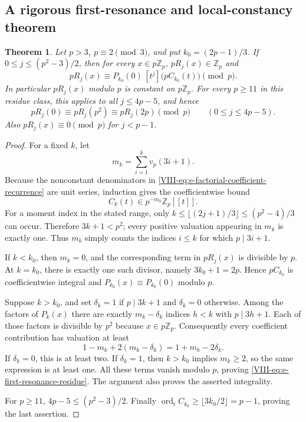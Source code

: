 \documentclass[11pt,letterpaper]{article}
\newtheorem{theorem}{Theorem}[section]
\numberwithin{equation}{section}
\begin{document}
\subsection{A rigorous first-resonance and local-constancy theorem}
\begin{theorem}\label{VIII-thm:e-first-resonance}
Let $p>3$, $p\equiv2\pmod3$, and put $k_0=(2p-1)/3$.
If $0\le j\le(p^2-3)/2$, then for every $x\in p\mathbb Z_p$,
$pR_j(x)\in\mathbb Z_p$ and
\begin{equation}\label{VIII-eq:e-first-resonance-residue}
 pR_j(x)\equiv
 P_{k_0}(0)\,[t^j]\bigl(pC_{k_0}(t)\bigr)\pmod p.
\end{equation}
In particular $pR_j(x)$ modulo $p$ is constant on $p\mathbb Z_p$.
For every $p\ge11$ in this residue class, this applies to all
$j\le4p-5$, and hence
\[
 pR_j(0)\equiv pR_j(p^2)\equiv pR_j(2p)\pmod p
 \qquad(0\le j\le4p-5).
\]
Also $pR_j(x)\equiv0\pmod p$ for $j<p-1$.
\end{theorem}
\begin{proof}
For a fixed $k$, let
\[
 m_k=\sum_{i=1}^k v_p(3i+1).
\]
Because the nonconstant denominators in
\eqref{VIII-eq:e-factorial-coefficient-recurrence} are unit series,
induction gives the coefficientwise bound
\[
 C_k(t)\in p^{-m_k}\mathbb Z_p[[t]].
\]
For a moment index in the stated range, only
$k\le\lfloor(2j+1)/3\rfloor\le(p^2-4)/3$ can occur.
Therefore $3k+1<p^2$; every positive valuation appearing in
$m_k$ is exactly one. Thus $m_k$ simply counts the indices
$i\le k$ for which $p\mid3i+1$.

If $k<k_0$, then $m_k=0$, and the corresponding term in
$pR_j(x)$ is divisible by $p$. At $k=k_0$, there is exactly
one such divisor, namely $3k_0+1=2p$. Hence $pC_{k_0}$ is
coefficientwise integral and $P_{k_0}(x)\equiv P_{k_0}(0)$
modulo $p$.

Suppose $k>k_0$, and set
$\delta_k=1$ if $p\mid3k+1$ and $\delta_k=0$ otherwise.
Among the factors of $P_k(x)$ there are exactly
$m_k-\delta_k$ indices $h<k$ with $p\mid3h+1$.
Each of those factors is divisible by $p^2$ because $x\in p\mathbb Z_p$.
Consequently every coefficient contribution has valuation at least
\[
 1-m_k+2(m_k-\delta_k)=1+m_k-2\delta_k.
\]
If $\delta_k=0$, this is at least two. If $\delta_k=1$, then
$k>k_0$ implies $m_k\ge2$, so the same expression is at least one.
All these terms vanish modulo $p$, proving
\eqref{VIII-eq:e-first-resonance-residue}.
The argument also proves the asserted integrality.

For $p\ge11$, $4p-5\le(p^2-3)/2$.
Finally $\operatorname{ord}_t C_{k_0}\ge
\lfloor3k_0/2\rfloor=p-1$, proving the last assertion.
\end{proof}
\end{document}
